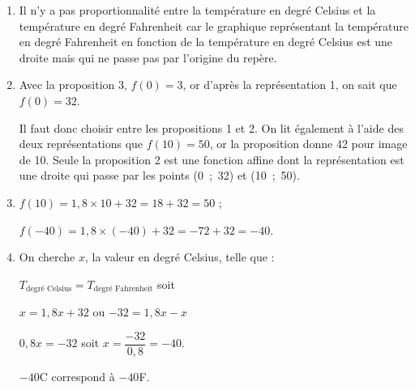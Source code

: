 \begin{enumerate}
\item %
Il n’y a pas proportionnalité entre la température en degré Celsius et la température
en degré Fahrenheit car le graphique représentant la température en degré Fahrenheit
en fonction de la température en degré Celsius est une droite mais qui ne passe pas par
l’origine du repère.
\item  %


Avec la proposition 3, $f(0) = 3$, or d’après la représentation 1, on sait que
$f(0) = 32$.

Il faut donc choisir entre les propositions 1 et 2. On lit également à l’aide des deux
représentations que $f(10) = 50$, or la proposition donne 42 pour image de 10. Seule la
proposition 2 est une fonction affine dont la représentation est une droite qui passe par
les points (0~;~32) et (10~;~50).
\item  %

$f(10) =1,8 \times 10 + 32 = 18 + 32 = 50$ ;

$f(- 40) = 1,8 \times (- 40) + 32 = - 72 + 32 = - 40$.
\item  %
On cherche $x$, la valeur en degré Celsius, telle que :

$T_{\text{degré Celsius}} = T_{\text{degré Fahrenheit}}$ soit 

$x = 1,8x + 32$ ou  $- 32  = 1,8x - x$

$0,8x = -32$ soit $x = \dfrac{- 32}{0,8} = - 40$.

$- 40$\degres C correspond  à $- 40$\degres F.
\end{enumerate}

\vspace{0,5cm}

